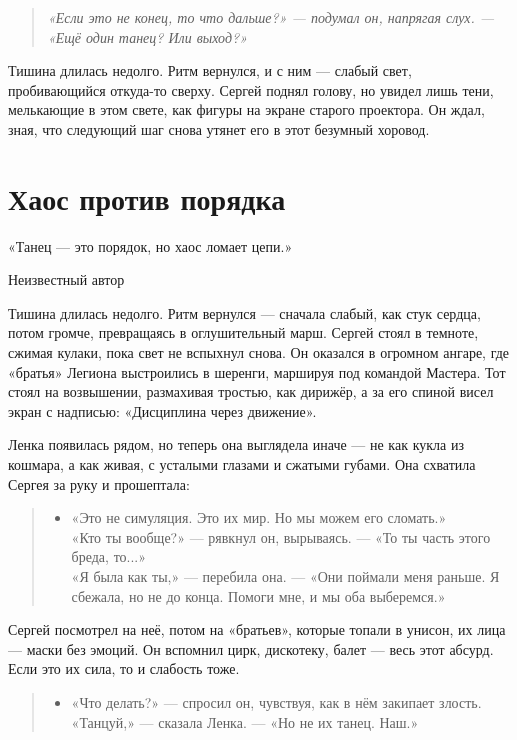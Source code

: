\documentclass[12pt,a4paper]{book}
\newenvironment{dialogue}{\begin{quote}\itshape\begin{itemize}\item[]}{\end{itemize}\end{quote}}
\newenvironment{innerthought}{\begin{quote}\small\itshape}{\end{quote}}
\begin{document}
\begin{innerthought}
«Если это не конец, то что дальше?» --- подумал он, напрягая слух. --- «Ещё один танец? Или выход?»
\end{innerthought}

Тишина длилась недолго. Ритм вернулся, и с ним --- слабый свет, пробивающийся откуда-то сверху. Сергей поднял голову, но увидел лишь тени, мелькающие в этом свете, как фигуры на экране старого проектора. Он ждал, зная, что следующий шаг снова утянет его в этот безумный хоровод.

\chapter{Хаос против порядка}
\epigraph{«Танец — это порядок, но хаос ломает цепи.»}{Неизвестный автор}

Тишина длилась недолго. Ритм вернулся --- сначала слабый, как стук сердца, потом громче, превращаясь в оглушительный марш. Сергей стоял в темноте, сжимая кулаки, пока свет не вспыхнул снова. Он оказался в огромном ангаре, где «братья» Легиона выстроились в шеренги, маршируя под командой Мастера. Тот стоял на возвышении, размахивая тростью, как дирижёр, а за его спиной висел экран с надписью: «Дисциплина через движение».

Ленка появилась рядом, но теперь она выглядела иначе --- не как кукла из кошмара, а как живая, с усталыми глазами и сжатыми губами. Она схватила Сергея за руку и прошептала:

\begin{dialogue}
«Это не симуляция. Это их мир. Но мы можем его сломать.» \\
«Кто ты вообще?» --- рявкнул он, вырываясь. --- «То ты часть этого бреда, то...» \\
«Я была как ты,» --- перебила она. --- «Они поймали меня раньше. Я сбежала, но не до конца. Помоги мне, и мы оба выберемся.»
\end{dialogue}

Сергей посмотрел на неё, потом на «братьев», которые топали в унисон, их лица --- маски без эмоций. Он вспомнил цирк, дискотеку, балет --- весь этот абсурд. Если это их сила, то и слабость тоже.

\begin{dialogue}
«Что делать?» --- спросил он, чувствуя, как в нём закипает злость. \\
«Танцуй,» --- сказала Ленка. --- «Но не их танец. Наш.»
\end{dialogue}
\end{document}
